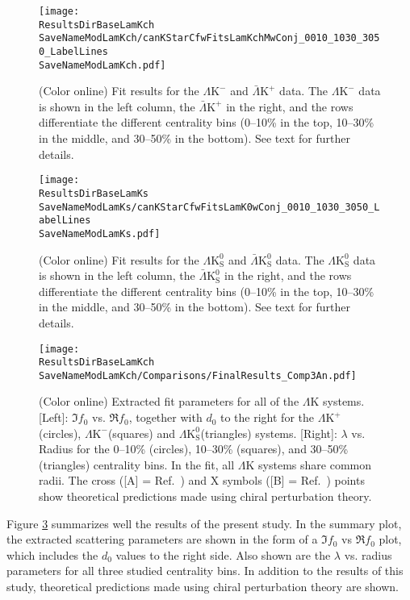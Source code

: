 \documentclass[ALICE,manyauthors]{cernphprep}
\newcommand{\ResultsDirBaseLamKch}{/home/jesse/Analysis/FemtoAnalysis/Results/Results_cLamcKch_20180505/}
\newcommand{\ResultsDirBaseLamKs}{/home/jesse/Analysis/FemtoAnalysis/Results/Results_cLamK0_20180505/}
\newcommand{\MomRes}{_MomResCrctn}%
\newcommand{\NonFlatBgdLamKch}{_NonFlatBgdCrctnLamK0LinearLamKchPolynomial}
\newcommand{\NonFlatBgdLamKs}{_NonFlatBgdCrctnLamK0LinearLamKchPolynomial}
\newcommand{\ResNum}{_3Res}
\newcommand{\PrimMaxDecay}{_PrimMaxDecay10fm}
\newcommand{\ResMethod}{_UsingXiDataAndCoulombOnly}
\newcommand{\ParamFixAndShareLamKch}{_ShareLam_Dualie_ShareLam_ShareRadii}
\newcommand{\ParamFixAndShareLamKs}{_ShareLam_Dualie_ShareLam_ShareRadii}
\newcommand{\SaveNameModLamKch}{\MomRes\NonFlatBgdLamKch\ResNum\PrimMaxDecay\ResMethod\ParamFixAndShareLamKch}
\newcommand{\SaveNameModLamKs}{\MomRes\NonFlatBgdLamKs\ResNum\PrimMaxDecay\ResMethod\ParamFixAndShareLamKs}
\newcommand{\LamK}{$\Lambda$K\xspace}
\newcommand{\LamKchP}{$\Lambda\mathrm{K^{+}}$\xspace}
\newcommand{\LamKchM}{$\Lambda\mathrm{K^{-}}$\xspace}
\newcommand{\ALamKchP}{$\bar{\Lambda}\mathrm{K^{+}}$\xspace}
\newcommand{\LamKchMALamKchP}{$\Lambda\mathrm{K^{-}}$($\bar{\Lambda}\mathrm{K^{+}}$)\xspace}
\newcommand{\LamKs}{$\Lambda\mathrm{K^{0}_{S}}$\xspace}
\newcommand{\ALamKs}{$\bar{\Lambda}\mathrm{K^{0}_{S}}$\xspace}
\newcommand{\LamALamKs}{$\Lambda$($\bar{\Lambda}$)$\mathrm{K^{0}_{S}}$\xspace}
\begin{document}
\begin{figure}[h!]
  \centering
  \texttt{[image: \\ResultsDirBaseLamKch\\SaveNameModLamKch/canKStarCfwFitsLamKchMwConj\_0010\_1030\_3050\_LabelLines\\SaveNameModLamKch.pdf]}
  \caption[\LamKchMALamKchP data with fits]
  {
  (Color online) Fit results for the \LamKchM and \ALamKchP data.
  The \LamKchM data is shown in the left column, the \ALamKchP in the right, and the rows differentiate the different centrality bins (0--10\% in the top, 10--30\% in the middle, and 30--50\% in the bottom).
 See text for further details.
 }
  \label{fig:LamKchMwConjFits_3Res}
\end{figure}


\begin{figure}[h!]
  \centering
  \texttt{[image: \\ResultsDirBaseLamKs\\SaveNameModLamKs/canKStarCfwFitsLamK0wConj\_0010\_1030\_3050\_LabelLines\\SaveNameModLamKs.pdf]}
  \caption[\LamALamKs data with fits]
  {
  (Color online) Fit results for the \LamKs and \ALamKs data.
  The \LamKs data is shown in the left column, the \ALamKs in the right, and the rows differentiate the different centrality bins (0--10\% in the top, 10--30\% in the middle, and 30--50\% in the bottom).
 See text for further details.
 }
  \label{fig:LamK0wConjFits_3Res}
\end{figure}




\begin{figure}[h]
  \centering
  \texttt{[image: \\ResultsDirBaseLamKch\\SaveNameModLamKch/Comparisons/FinalResults\_Comp3An.pdf]}
  \caption[Extracted Scattering Parameters]
  {
  (Color online) Extracted fit parameters for all of the \LamK systems.  
  [Left]: $\Im f_{0}$ vs. $\Re f_{0}$, together with $d_{0}$ to the right for the \LamKchP (circles), \LamKchM (squares) and \LamKs (triangles) systems.  
  [Right]: $\lambda$ vs. Radius for the 0--10\% (circles), 10--30\% (squares), and 30--50\% (triangles) centrality bins.  
  In the fit, all \LamK systems share common radii.
  The cross ([A] = Ref.\ \cite{Liu:2006xja}) and X symbols ([B] = Ref.\ \cite{Mai:2009ce}) points show theoretical predictions made using chiral perturbation theory.
  }
  \label{fig:ScattParams_3Res}
\end{figure}

Figure \ref{fig:ScattParams_3Res} summarizes well the results of the present study.
In the summary plot, the extracted scattering parameters are shown in the form of a $\Im f_{0}$ vs $\Re f_{0}$ plot, which includes the $d_{0}$ values to the right side.  
Also shown are the $\lambda$ vs. radius parameters for all three studied centrality bins. 
In addition to the results of this study, theoretical predictions made using chiral perturbation theory \cite{Liu:2006xja,Mai:2009ce} are shown.
\end{document}
